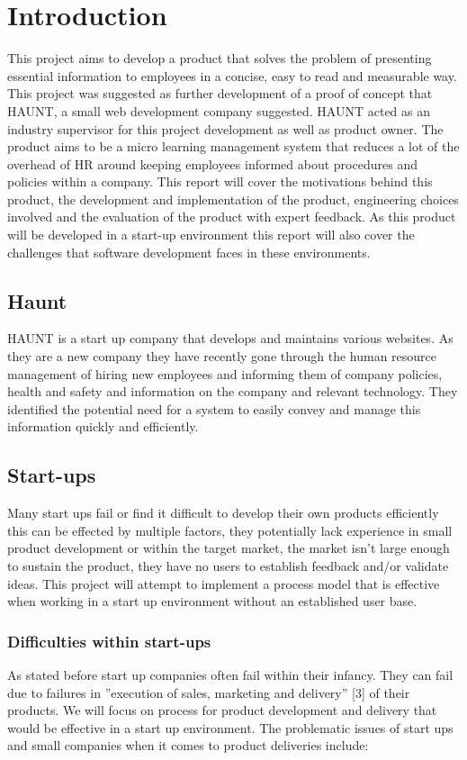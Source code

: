 \chapter{Introduction}\label{C:intro}
This project aims to develop a product that solves the problem of presenting essential information to employees in a concise, easy to read and measurable way. This project was suggested as further development of a proof of concept that HAUNT, a small web development company suggested. HAUNT acted as an industry supervisor for this project development as well as product owner. The product aims to be a micro learning management system that reduces a lot of the overhead of HR around keeping employees informed about procedures and policies within a company. This report will cover the motivations behind this product, the development and implementation of the product, engineering choices involved and the evaluation of the product with expert feedback. As this product will be developed in a start-up environment this report will also cover the challenges that software development faces in these environments.

\section{Haunt}
HAUNT is a start up company that develops and maintains various websites. As they are a new company they have recently gone through the human resource management of hiring new employees and informing them of company policies, health and safety and information on the company and relevant technology. They identified the potential need for a system to easily convey and manage this information quickly and efficiently.

\section{Start-ups}
Many start ups fail or find it difficult to develop their own products efficiently this can be effected by multiple factors, they potentially lack experience in small product development or within the target market, the market isn’t large enough to sustain the product, they have no users to establish feedback and/or validate ideas. This project will attempt to implement a process model that is effective when working in a start up environment without an established user base.

\subsection{Difficulties within start-ups}
As stated before start up companies often fail within their infancy. They can fail due to failures in ”execution of sales, marketing and delivery” [3] of their products. We will focus on process for product development and delivery that would be effective in a start up environment. The problematic issues of start ups and small companies when it comes to product deliveries include:

